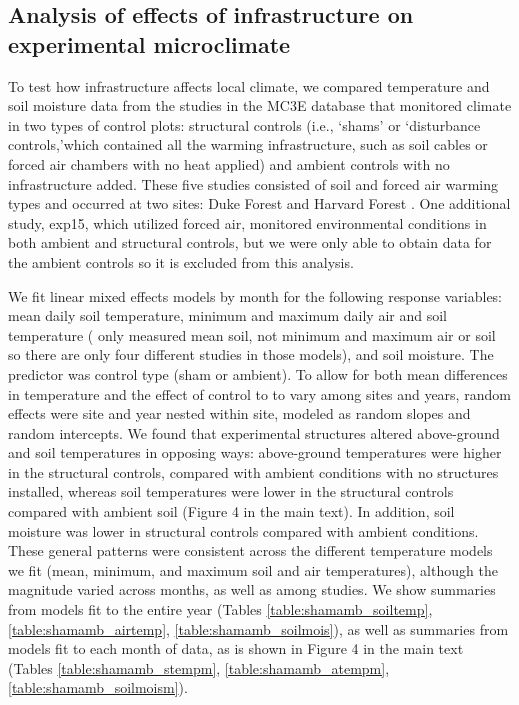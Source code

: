 \documentclass{article}
\begin{document}
\subsection* {Analysis of effects of infrastructure on experimental microclimate}
To test how infrastructure affects local climate, we compared temperature and soil moisture data from the studies in the MC3E database that monitored climate in two types of control plots: structural controls (i.e., `shams' or `disturbance controls,'which contained all the warming infrastructure, such as soil cables or forced air chambers with no heat applied) and ambient controls with no infrastructure added. These five studies consisted of soil and forced air warming types and occurred at two sites: Duke Forest and Harvard Forest \citep{farnsworth1995,clark2014a,marchin2015,pelini2011}. One additional study, exp15, which utilized forced air, monitored environmental conditions in both ambient and structural controls, but we were only able to obtain data for the ambient controls so it is excluded from this analysis.
\par We fit linear mixed effects models by month for the following response variables: mean daily soil temperature, minimum and maximum daily air and soil temperature (\citet{farnsworth1995} only measured mean soil, not minimum and maximum air or soil so there are only four different studies in those models), and soil moisture. The predictor was control type (sham or ambient). To allow for both mean differences in temperature and the effect of control to to vary among sites and years, random effects were site and year nested within site, modeled as random slopes and random intercepts. 
We found that experimental structures altered above-ground and soil temperatures in opposing ways: above-ground temperatures were higher in the structural controls, compared with ambient conditions with no structures installed, whereas soil temperatures were lower in the structural controls compared with ambient soil (Figure 4 in the main text).  In addition, soil moisture was lower in structural controls compared with ambient conditions. These general patterns were consistent across the different temperature models we fit (mean, minimum, and maximum soil and air temperatures), although the magnitude varied across months, as well as among studies. We show summaries from models fit to the entire year (Tables \ref{table:shamamb_soiltemp}, \ref{table:shamamb_airtemp}, \ref{table:shamamb_soilmois}), as well as summaries from models fit to each month of data, as is shown in Figure 4 in the main text (Tables \ref{table:shamamb_stempm}, \ref{table:shamamb_atempm}, \ref{table:shamamb_soilmoism}).
\end{document}
